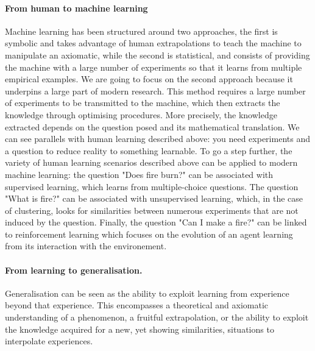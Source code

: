 \paragraph{From human to machine learning} 

Machine learning has been structured around two approaches, the first is symbolic and takes advantage of human extrapolations to teach the machine to manipulate an axiomatic, while the second is statistical, and consists of providing the machine with a large number of experiments so that it learns from multiple empirical examples. We are going to focus on the second approach because it underpins a large part of modern research.
This method requires a large number of experiments to be transmitted to the machine, which then extracts the knowledge through optimising procedures. More precisely, the knowledge extracted depends on the question posed and its mathematical translation. We can see parallels with human learning described above: you need experiments and a question to reduce reality to something learnable. To go a step further, the variety of human learning scenarios described above can be applied to modern machine learning: the question "Does fire burn?" can be associated with supervised learning, which learns from multiple-choice questions. The question "What is fire?" can be associated with unsupervised learning, which, in the case of clustering, looks for similarities between numerous experiments that are not induced by the question. Finally, the question "Can I make a fire?" can be linked to reinforcement learning which focuses on the evolution of an agent learning from its interaction with the environement.

\paragraph{From learning to generalisation.}

Generalisation can be seen as the ability to exploit learning from experience beyond that experience. This encompasses a theoretical and axiomatic understanding of a phenomenon, \ie a fruitful extrapolation, or the ability to exploit the knowledge acquired for a new, yet showing similarities, situations \ie to interpolate experiences. 

